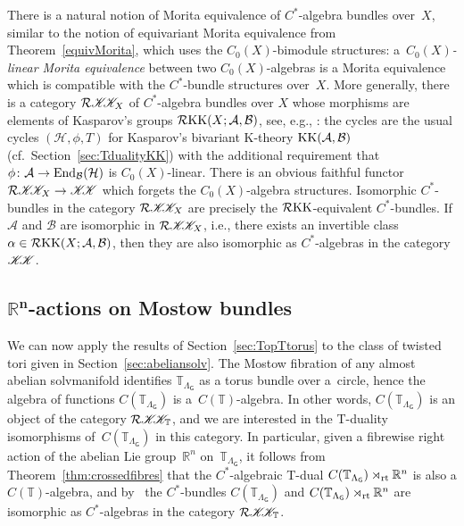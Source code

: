 \documentclass[10pt,a4paper]{amsart}
\numberwithin{equation}{section}
\newcommand{\CCK}{\mathscr{K}}
\newcommand{\sfG}{\mathsf{G}}
\newcommand{\End}{{\rm End}}
\newcommand{\rt}{{\rm rt}}
\newcommand{\R}{\real}
\newcommand{\real}{{\mathbb R}} %
\newcommand{\torus}{{\mathbb T}} %
\def\alg{{\mathcal A}}
\def\balg{{\mathcal B}}
\def\hil{{\mathcal H}}
\begin{document}
\begin{Remark}\label{rem:MoritaRKK}
There is a natural notion of Morita equivalence of $C^*$-algebra bundles over~$X$, similar to the notion of
equivariant Morita equivalence from Theorem~\ref{equivMorita}, which
uses the $C_0(X)$-bimodule structures: a~\emph{$C_0(X)$-linear Morita equivalence} between two
$C_0(X)$-algebras is a Morita equivalence which is compatible with the
$C^*$-bundle structures over~$X$. More generally, there is a category
$\mathcal{R}\CCK\hspace{-1mm}\CCK_X$ of $C^*$-algebra bundles over $X$ whose morphisms are
elements of Kasparov's groups $\mathcal{R}{\rm KK}(X;\alg,\balg)$, see, e.g., \cite{Echterhoff2009}: the cycles are the usual cycles
$(\hil,\phi,T)$ for Kasparov's bivariant K-theory ${\rm
 KK}(\alg,\balg)$ (cf.\ Section~\ref{sec:TdualityKK}) with the
additional requirement that $\phi\colon \alg\to\End_\balg(\hil)$ is
$C_0(X)$-linear. There is an obvious faithful functor
$\mathcal{R}\CCK\hspace{-1mm}\CCK_X \to \CCK\hspace{-1mm}\CCK$ which forgets the
$C_0(X)$-algebra structures. Isomorphic $C^*$-bundles in the category
$\mathcal{R}\CCK\hspace{-1mm}\CCK_X$ are precisely the $\mathcal{R}{\rm KK}$-equivalent
$C^*$-bundles. If $\alg$ and $\balg$ are isomorphic in
$\mathcal{R}\CCK\hspace{-1mm}\CCK_X$, i.e., there exists an invertible class
$\alpha\in \mathcal{R}{\rm KK}(X;\alg,\balg)$, then they are also
isomorphic as
$C^*$-algebras in the category $\CCK\hspace{-1mm}\CCK$.
\end{Remark}

\subsection[$\real^n$-actions on Mostow bundles]{$\boldsymbol{\real^n}$-actions on Mostow bundles}\label{sec:RMostow}

We can now apply the results of Section~\ref{sec:TopTtorus} to the
class of twisted tori given in
Section~\ref{sec:abeliansolv}.
The Mostow fibration of any almost abelian solvmanifold identifies
$\torus_{\Lambda_\sfG}$ as a torus bundle over a~circle, hence the
algebra of functions $C(\torus_{\Lambda_\sfG})$ is a~$C(\torus)$-algebra. In other words, $C(\torus_{\Lambda_\sfG})$ is an
object of the category $\mathcal{R}\CCK\hspace{-1mm}\CCK_\torus$, and we are
interested in the T-duality isomorphisms of~$C(\torus_{\Lambda_\sfG})$
in this category. In particular, given a fibrewise right action of the abelian
Lie group~$\R^n$ on~$\torus_{\Lambda_\sfG}$, it follows from
Theorem~\ref{thm:crossedfibres} that the $C^*$-algebraic T-dual
$C(\torus_{\Lambda_\sfG})\rtimes_\rt\R^n$ is also a $C(\torus)$-algebra, and by~\cite[Theorem~3.5]{Echterhoff2009} the $C^*$-bundles
$C(\torus_{\Lambda_\sfG})$ and
$C(\torus_{\Lambda_\sfG})\rtimes_\rt\R^n$ are isomorphic as $C^*$-algebras in the
category $\mathcal{R}\CCK\hspace{-1mm}\CCK_\torus$.
\end{document}
